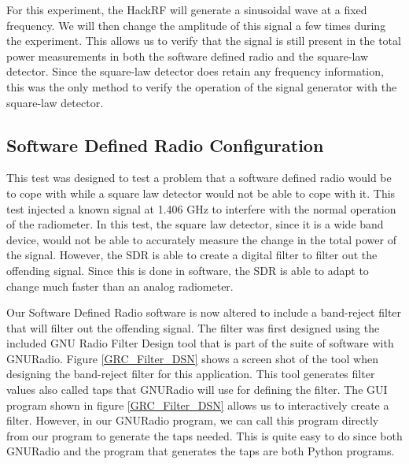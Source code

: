 For this experiment, the HackRF will generate a sinusoidal wave at a fixed frequency.  We will then change the amplitude of this signal a few times during the experiment.  This allows us to verify that the signal is still present in the total power measurements in both the software defined radio and the square-law detector.  Since the square-law detector does retain any frequency information, this was the only method to verify the operation of the signal generator with the square-law detector.   

\subsection{Software Defined Radio Configuration}

This test was designed to test a problem that a software defined radio would be to cope with while a square law detector would not be able to cope with it.  This test injected a known signal at 1.406 GHz to interfere with the normal operation of the radiometer.  In this test, the square law detector, since it is a wide band device, would not be able to accurately measure the change in the total power of the signal.  However, the SDR is able to create a digital filter to filter out the offending signal.  Since this is done in software, the SDR is able to adapt to change much faster than an analog radiometer.

Our Software Defined Radio software is now altered to include a band-reject filter that will filter out the offending signal.  The filter was first designed using the included GNU Radio Filter Design tool that is part of the suite of software with GNURadio.  Figure \ref{GRC_Filter_DSN} shows a screen shot of the tool when designing the band-reject filter for this application.  This tool generates filter values also called taps that GNURadio will use for defining the filter.  The GUI program shown in figure \ref{GRC_Filter_DSN} allows us to interactively create a filter.  However, in our GNURadio program, we can call this program directly from our program to generate the taps needed.  This is quite easy to do since both GNURadio and the program that generates the taps are both Python programs.  

